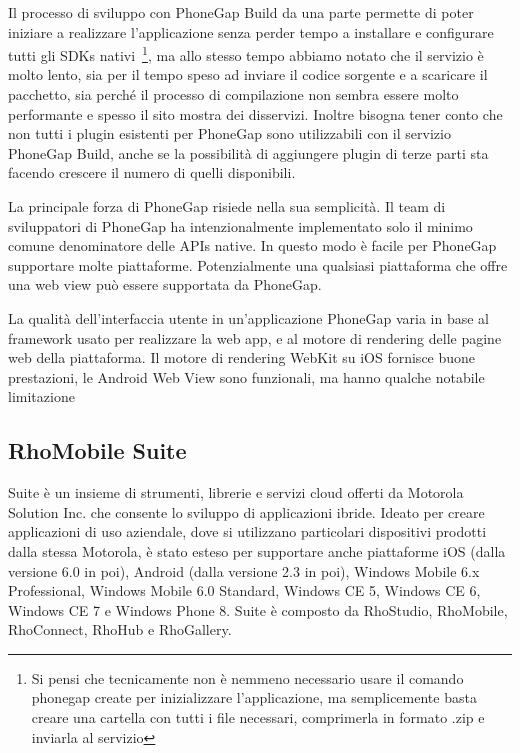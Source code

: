             Il processo di sviluppo con PhoneGap Build da una parte permette di
            poter iniziare a realizzare l'applicazione senza perder tempo a
            installare e configurare tutti gli SDKs nativi~\footnote{Si pensi
            che tecnicamente non è nemmeno necessario usare il comando
            phonegap create per inizializzare l'applicazione, ma semplicemente
            basta creare una cartella con tutti i file necessari, comprimerla
            in formato .zip e inviarla al servizio}, ma allo stesso tempo
            abbiamo notato che il servizio è molto lento, sia per il tempo speso
            ad inviare il codice sorgente e a scaricare il pacchetto, sia perché
            il processo di compilazione non sembra essere molto performante e
            spesso il sito mostra
            dei disservizi. Inoltre bisogna tener conto che non tutti i plugin
            esistenti per PhoneGap sono utilizzabili con il servizio
            PhoneGap Build, anche se la possibilità di aggiungere plugin di terze
            parti sta facendo crescere il numero di quelli disponibili.

            La principale forza di PhoneGap risiede nella sua semplicità.
            Il team di sviluppatori di PhoneGap ha intenzionalmente implementato
            solo il minimo comune denominatore delle APIs native. In questo modo
            è facile per PhoneGap supportare molte piattaforme. Potenzialmente
            una qualsiasi piattaforma che offre una web view può essere supportata
            da PhoneGap.

            La qualità dell'interfaccia utente in un'applicazione PhoneGap
            varia in base al frame\-work usato per realizzare la web app, e al
            motore di rendering delle pagine web della piattaforma.
            Il motore di rendering WebKit su iOS fornisce buone prestazioni, le
            Android Web View sono funzionali, ma hanno qualche notabile
            limitazione~\citep{Web:KevinSite}


        \subsection{RhoMobile Suite}
            \rhom{} Suite è un insieme di strumenti, librerie e servizi cloud
            offerti da Motorola Solution Inc. che consente lo sviluppo di
            applicazioni ibride. Ideato per creare applicazioni di uso aziendale,
            dove si utilizzano particolari dispositivi prodotti dalla stessa
            Motorola, è stato esteso per supportare anche piattaforme iOS
            (dalla versione 6.0 in poi), Android (dalla versione 2.3 in poi),
            Windows Mobile 6.x Professional, Windows Mobile 6.0 Standard,
            Windows CE 5, Windows CE 6, Windows CE 7 e Windows Phone 8.
            \rhom{} Suite è composto da RhoStudio, RhoMobile, RhoConnect,
            RhoHub e RhoGallery.
